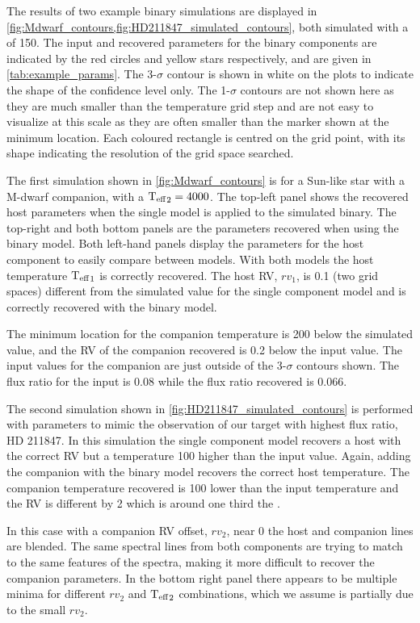 The results of two example binary simulations are displayed in \cref{fig:Mdwarf_contours,fig:HD211847_simulated_contours}, both simulated with a \snr{} of 150.
The input and recovered parameters for the binary components are indicated by the red circles and yellow stars respectively, and are given in \cref{tab:example_params}.
The 3-\(\sigma\) contour is shown in white on the plots to indicate the shape of the confidence level only.
The 1-\(\sigma\) contours are not shown here as they are much smaller than the temperature grid step and are not easy to visualize at this scale as they are often smaller than the marker shown at the minimum location.
Each coloured rectangle is centred on the grid point, with its shape indicating the resolution of the grid space searched.

The first simulation shown in \cref{fig:Mdwarf_contours} is for a Sun-like star with a M-dwarf companion, with a \({\textrm{T}_{\mathrm{eff}}}_{2} =4000\)\K{}.
The top-left panel shows the recovered host parameters when the single model is applied to the simulated binary.
The top-right and both bottom panels are the parameters recovered when using the binary model.
Both left-hand panels display the parameters for the host component to easily compare between models.
With both models the host temperature \({\textrm{T}_{\mathrm{eff}}}_{1}\) is correctly recovered.
The host {RV}, \({rv}_1\), is 0.1\kmps{} (two grid spaces) different from the simulated value for the single component model and is correctly recovered with the binary model.

The minimum \textchisquared{} location for the companion temperature is 200\K{} below the simulated value, and the {RV} of the companion recovered is 0.2\kmps{} below the input value.
The input values for the companion are just outside of the 3-\(\sigma\) contours shown.
The flux ratio for the input is 0.08 while the flux ratio recovered is 0.066.

The second simulation shown in \cref{fig:HD211847_simulated_contours} is performed with parameters to mimic the observation of our target with highest flux ratio, {HD 211847}.
In this simulation the single component model recovers a host with the correct {RV} but a temperature 100\K{} higher than the input value.
Again, adding the companion with the binary model recovers the correct host temperature.
The companion temperature recovered is 100\K{} lower than the input temperature and the {RV} is different by 2\kmps{} which is around one third the {\fwhm}.

In this case with a companion {RV} offset, \({rv}_2\), near 0\kmps{} the host and companion lines are blended.
The same spectral lines from both components are trying to match to the same features of the spectra, making it more difficult to recover the companion parameters.
In the bottom right panel there appears to be multiple minima for different \({rv}_2\) and \({\textrm{T}_{\mathrm{eff}}}_{2}\) combinations, which we assume is partially due to the small \({rv}_2\).

